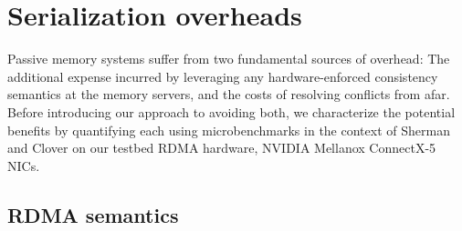 \section{Serialization overheads}




Passive memory systems suffer from two fundamental sources of overhead: The
additional expense incurred by leveraging any hardware-enforced consistency
semantics at the memory servers, and the costs of resolving conflicts from afar.
Before introducing our approach to avoiding both, we characterize the
potential benefits by quantifying each using microbenchmarks in the context of
Sherman and Clover on our testbed RDMA hardware, NVIDIA Mellanox ConnectX-5
NICs.





\subsection{RDMA semantics}

